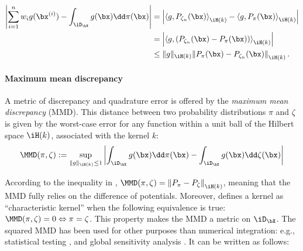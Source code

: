 \begin{subequations}
\begin{align}
    \left| \sum_{i=1}^{n} w_i g(\bx^{(i)}) - \int_{\iD_{\bX}} g(\bx) \dd \pi(\bx) \right| &= \left| \left\langle g, P_{\zeta_n}(\bx) \right\rangle_{\iH(k)} - \left\langle g, P_{\pi}(\bx) \right\rangle_{\iH(k)} \right| \\
    &= \left| \left\langle g, \left(P_{\zeta_n}(\bx) - P_{\pi}(\bx)\right) \right\rangle_{\iH(k)} \right|\\
    &\leq \lVert g \lVert_{\iH(k)}  \left\lVert P_{\pi}(\bx) - P_{\zeta_n}(\bx) \right\lVert_{\iH(k)}.
    \label{eq:quad_error}
\end{align}
\end{subequations}

\paragraph{Maximum mean discrepancy}
A metric of discrepancy and quadrature error is offered by the \emph{maximum mean discrepancy} (MMD). 
This distance between two probability distributions $\pi$ and $\zeta$ is given by the worst-case error for any function within a unit ball of the Hilbert space $\iH(k)$, associated with the kernel $k$:
\begin{equation}
    \MMD(\pi, \zeta) := %
    \sup_{\lVert g \lVert_{\iH(k)} \leq 1}
            \left | \int_{\iD_{\bX}} g(\bx) \dd \pi(\bx) - \int_{\iD_{\bX}} g(\bx) \dd \zeta(\bx) \right| %
    \label{eq:mmd_c4}  
\end{equation}

According to the inequality in , $\MMD(\pi, \zeta) = \left\lVert P_{\pi} - P_{\zeta} \right\lVert_{\iH(k)}$, meaning that the MMD fully relies on the difference of potentials. 
Moreover, \cite{sriperumbudur_2010} defines a kernel as ``characteristic kernel'' when the following equivalence is true: $\MMD(\pi, \zeta) = 0 \Leftrightarrow \pi = \zeta$. 
This property makes the MMD a metric on $\iD_{\bX}$. 
The squared MMD has been used for other purposes than numerical integration: e.g., statistical testing \citep{gretton_2006}, and global sensitivity analysis \citep{daveiga_2015}. 
It can be written as follows:


